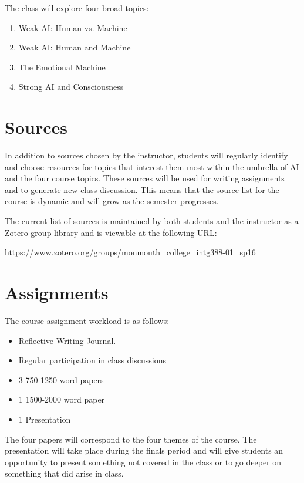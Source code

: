 \documentclass[]{tufte-handout}
\begin{document}
The class will explore four broad topics:
\begin{enumerate}
\item Weak AI: Human vs. Machine
\item Weak AI: Human and Machine
\item The Emotional Machine
\item Strong AI and Consciousness
\end{enumerate}

\section{Sources}

In addition to sources chosen by the instructor, students will regularly identify and choose resources for topics that interest them most within the umbrella of AI and the four course topics. These sources will be used for writing assignments and to generate new class discussion.  This means that the source list for the course is dynamic and will grow as the semester progresses. 

The current list of sources is maintained by both students and the instructor as a Zotero group library and is viewable at the following URL:
\vspace{.2in}

\begin{footnotesize}
\url{https://www.zotero.org/groups/monmouth_college_intg388-01_sp16}
\end{footnotesize}

 
\section{Assignments}

The course assignment workload is as follows:
\begin{itemize}
\item Reflective Writing Journal. 
\item Regular participation in class discussions
\item 3 750-1250 word papers
\item 1 1500-2000 word paper
\item 1 Presentation 
\end{itemize}
The four papers will correspond to the four themes of the course. The presentation will take place during the finals period and will give students an opportunity to present something not covered in the class or to go deeper on something that did arise in class.
\end{document}
